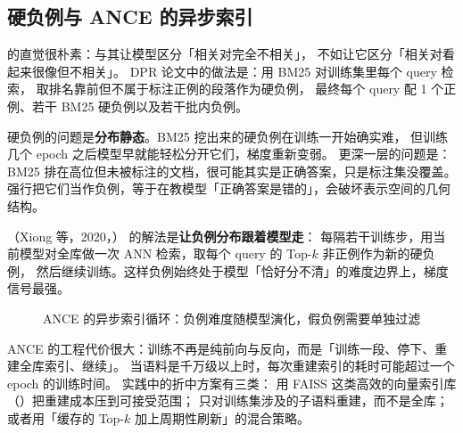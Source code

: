 \subsection{硬负例与 ANCE 的异步索引}

 的直觉很朴素：与其让模型区分「相关对完全不相关」，
不如让它区分「相关对看起来很像但不相关」。
DPR 论文中的做法是：用 BM25 对训练集里每个 query 检索，
取排名靠前但不属于标注正例的段落作为硬负例，
最终每个 query 配 1 个正例、若干 BM25 硬负例以及若干批内负例。

硬负例的问题是\textbf{分布静态}。BM25 挖出来的硬负例在训练一开始确实难，
但训练几个 epoch 之后模型早就能轻松分开它们，梯度重新变弱。
更深一层的问题是：
BM25 排在高位但未被标注的文档，很可能其实是正确答案，只是标注集没覆盖。
强行把它们当作负例，等于在教模型「正确答案是错的」，会破坏表示空间的几何结构。

（Xiong 等，2020，\cite{xiong2020ance}）
的解法是\textbf{让负例分布跟着模型走}：
每隔若干训练步，用当前模型对全库做一次 ANN 检索，取每个 query 的 Top-$k$ 非正例作为新的硬负例，
然后继续训练。这样负例始终处于模型「恰好分不清」的难度边界上，梯度信号最强。

\begin{figure}[htbp]
\centering
{}
\caption{ANCE 的异步索引循环：负例难度随模型演化，假负例需要单独过滤}
\label{fig:ance-loop}
\end{figure}

ANCE 的工程代价很大：训练不再是纯前向与反向，而是「训练一段、停下、重建全库索引、继续」。
当语料是千万级以上时，每次重建索引的耗时可能超过一个 epoch 的训练时间。
实践中的折中方案有三类：
用 FAISS 这类高效的向量索引库（\cite{johnson2019faiss}）把重建成本压到可接受范围；
只对训练集涉及的子语料重建，而不是全库；
或者用「缓存的 Top-$k$ 加上周期性刷新」的混合策略。

